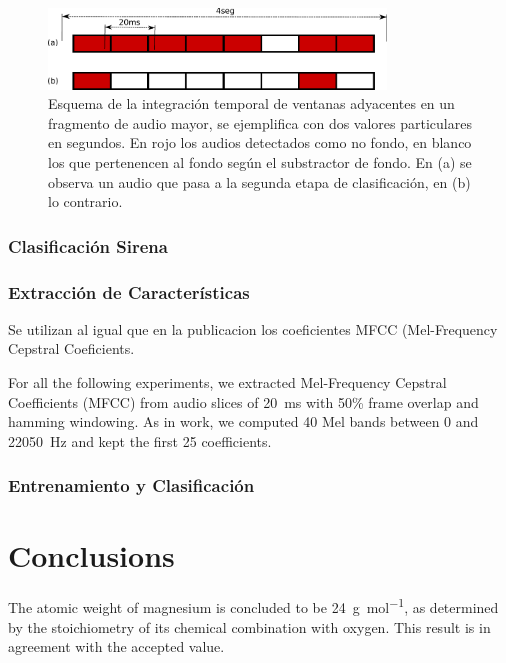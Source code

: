 \documentclass{article}
\begin{document}
\begin{figure}[h]
\begin{center}
\includegraphics[width=0.8\textwidth]{integracion_temporal} 
\caption{Esquema de la integración temporal de ventanas adyacentes en un fragmento de audio mayor, se ejemplifica con dos valores particulares en segundos. En rojo los audios detectados como no fondo, en blanco los que pertenencen al fondo según el substractor de fondo. En (a) se observa un audio que pasa a la segunda etapa de clasificación, en (b) lo contrario.}
\label{fig:integracion_temporal}
\end{center}
\end{figure}
 
\subsubsection{Clasificación Sirena}

\subsubsection*{Extracción de Características}
Se utilizan al igual que en la publicacion \cite{Salamon:UrbanSound:ACMMM:14} los coeficientes MFCC (Mel-Frequency Cepstral Coeficients. 

For all the following experiments, we extracted Mel-Frequency Cepstral Coefficients (MFCC) from audio slices of \SI{20}{\milli\second} with 50\% frame overlap and hamming windowing. As in  work, we computed 40 Mel bands between 0 and \SI{22050}{\Hz} and kept the first 25 coefficients. 

\subsubsection*{Entrenamiento y Clasificación}



\section{Conclusions}

The atomic weight of magnesium is concluded to be \SI{24}{\gram\per\mol}, as determined by the stoichiometry of its chemical combination with oxygen. This result is in agreement with the accepted value.






\end{document}
